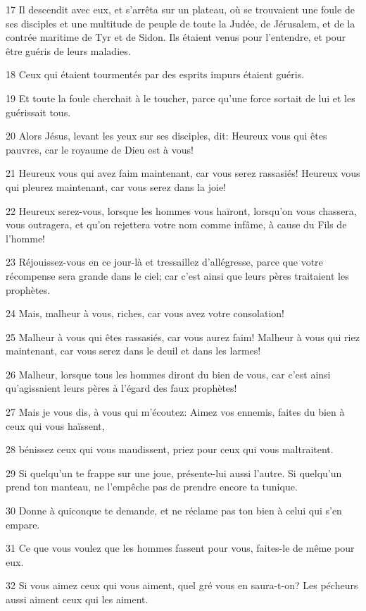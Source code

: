 \par 17 Il descendit avec eux, et s'arrêta sur un plateau, où se trouvaient une foule de ses disciples et une multitude de peuple de toute la Judée, de Jérusalem, et de la contrée maritime de Tyr et de Sidon. Ils étaient venus pour l'entendre, et pour être guéris de leurs maladies.
\par 18 Ceux qui étaient tourmentés par des esprits impurs étaient guéris.
\par 19 Et toute la foule cherchait à le toucher, parce qu'une force sortait de lui et les guérissait tous.
\par 20 Alors Jésus, levant les yeux sur ses disciples, dit: Heureux vous qui êtes pauvres, car le royaume de Dieu est à vous!
\par 21 Heureux vous qui avez faim maintenant, car vous serez rassasiés! Heureux vous qui pleurez maintenant, car vous serez dans la joie!
\par 22 Heureux serez-vous, lorsque les hommes vous haïront, lorsqu'on vous chassera, vous outragera, et qu'on rejettera votre nom comme infâme, à cause du Fils de l'homme!
\par 23 Réjouissez-vous en ce jour-là et tressaillez d'allégresse, parce que votre récompense sera grande dans le ciel; car c'est ainsi que leurs pères traitaient les prophètes.
\par 24 Mais, malheur à vous, riches, car vous avez votre consolation!
\par 25 Malheur à vous qui êtes rassasiés, car vous aurez faim! Malheur à vous qui riez maintenant, car vous serez dans le deuil et dans les larmes!
\par 26 Malheur, lorsque tous les hommes diront du bien de vous, car c'est ainsi qu'agissaient leurs pères à l'égard des faux prophètes!
\par 27 Mais je vous dis, à vous qui m'écoutez: Aimez vos ennemis, faites du bien à ceux qui vous haïssent,
\par 28 bénissez ceux qui vous maudissent, priez pour ceux qui vous maltraitent.
\par 29 Si quelqu'un te frappe sur une joue, présente-lui aussi l'autre. Si quelqu'un prend ton manteau, ne l'empêche pas de prendre encore ta tunique.
\par 30 Donne à quiconque te demande, et ne réclame pas ton bien à celui qui s'en empare.
\par 31 Ce que vous voulez que les hommes fassent pour vous, faites-le de même pour eux.
\par 32 Si vous aimez ceux qui vous aiment, quel gré vous en saura-t-on? Les pécheurs aussi aiment ceux qui les aiment.
